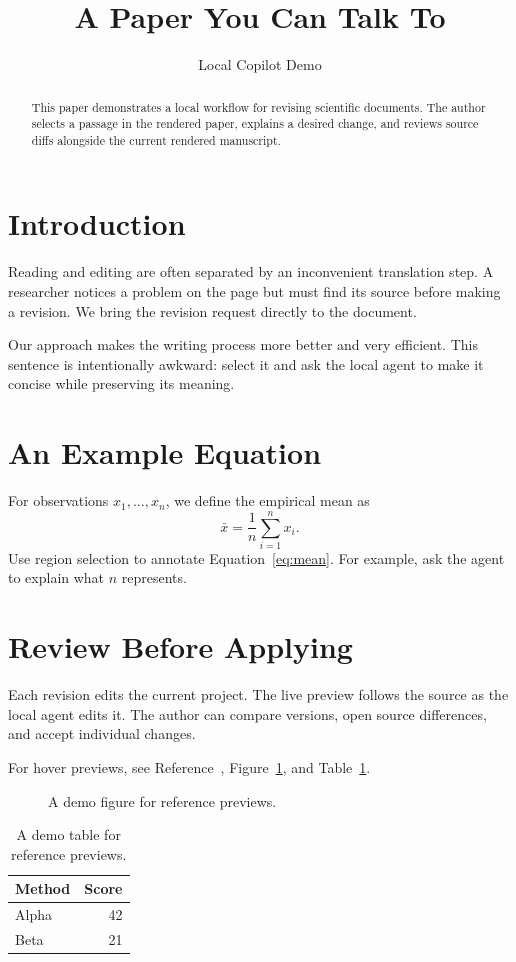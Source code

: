 \documentclass[11pt]{article}
\title{A Paper You Can Talk To}
\author{Local Copilot Demo}
\date{}
\begin{document}
\maketitle
\begin{abstract}
This paper demonstrates a local workflow for revising scientific documents.
The author selects a passage in the rendered paper, explains a desired change,
and reviews source diffs alongside the current rendered manuscript.
\end{abstract}
\section{Introduction}
Reading and editing are often separated by an inconvenient translation step.
A researcher notices a problem on the page but must find its source before
making a revision. We bring the revision request directly to the document.

Our approach makes the writing process more better and very efficient.
This sentence is intentionally awkward: select it and ask the local agent
to make it concise while preserving its meaning.

\section{An Example Equation}
For observations $x_1,\ldots,x_n$, we define the empirical mean as
\begin{equation}
  \bar{x}=\frac{1}{n}\sum_{i=1}^{n}x_i.
  \label{eq:mean}
\end{equation}
Use region selection to annotate Equation~\ref{eq:mean}.
For example, ask the agent to explain what $n$ represents.

\section{Review Before Applying}
Each revision edits the current project. The live preview follows
the source as the local agent edits it. The author can compare versions,
open source differences, and accept individual changes.

For hover previews, see Reference~\cite{demo,other}, Figure~\ref{fig:preview},
and Table~\ref{tab:preview}.

\clearpage
\begin{figure}[ht]
\centering\fbox{\rule{0pt}{90pt}\rule{180pt}{0pt}}
\caption{A demo figure for reference previews.}\label{fig:preview}
\end{figure}
\begin{table}[ht]
\caption{A demo table for reference previews.}\label{tab:preview}
\centering\begin{tabular}{lr}\hline
Method & Score\\\hline Alpha & 42\\ Beta & 21\\\hline
\end{tabular}
\end{table}
\end{document}
